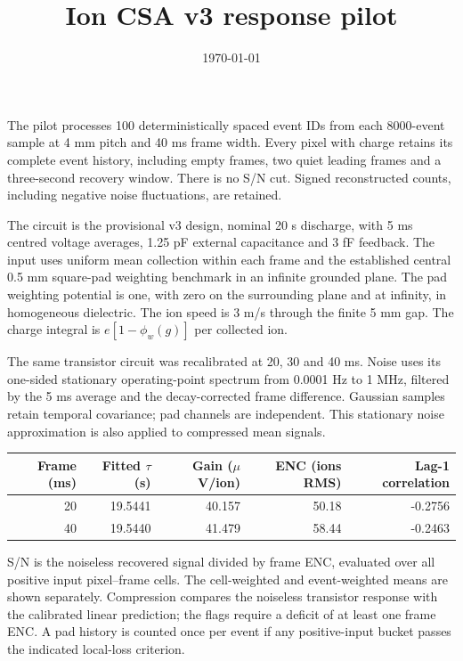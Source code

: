 \documentclass[10pt,a4paper]{article}
\title{Ion CSA v3 response pilot}
\date{\today}
\begin{document}
\maketitle
The pilot processes 100 deterministically spaced event IDs from each 8000-event
sample at 4 mm pitch and 40 ms frame width. Every pixel with charge retains its
complete event history, including empty frames, two quiet leading frames and a
three-second recovery window. There is no S/N cut. Signed reconstructed counts,
including negative noise fluctuations, are retained.

The circuit is the provisional v3 design, nominal 20 s discharge, with 5 ms
centred voltage averages, 1.25 pF external capacitance and 3 fF feedback. The input
uses uniform mean collection within each frame and the established central
0.5 mm square-pad weighting benchmark in an infinite grounded plane. The pad
weighting potential is one, with zero on the surrounding plane and at infinity,
in homogeneous dielectric. The ion speed is 3 m/s through the finite 5 mm gap.
The charge integral is $e[1-\phi_w(g)]$ per collected ion.

The same transistor circuit was recalibrated at 20, 30 and 40 ms. Noise uses its
one-sided stationary operating-point spectrum from 0.0001 Hz to 1 MHz, filtered
by the 5 ms average and the decay-corrected frame difference. Gaussian samples
retain temporal covariance; pad channels are independent. This stationary noise
approximation is also applied to compressed mean signals.
\begin{center}\begin{tabular}{rrrrr}\toprule
Frame (ms) & Fitted $\tau$ (s) & Gain ($\mu$V/ion) & ENC (ions RMS) & Lag-1 correlation\\\midrule
20 & 19.5441 & 40.157 & 50.18 & -0.2756 \\
40 & 19.5440 & 41.479 & 58.44 & -0.2463 \\
\bottomrule\end{tabular}\end{center}

S/N is the noiseless recovered signal divided by frame ENC, evaluated over all
positive input pixel--frame cells. The cell-weighted and event-weighted means
are shown separately. Compression compares the noiseless transistor response
with the calibrated linear prediction; the flags require a deficit of at least
one frame ENC. A pad history is counted once per event if any positive-input
bucket passes the indicated local-loss criterion.
\end{document}
